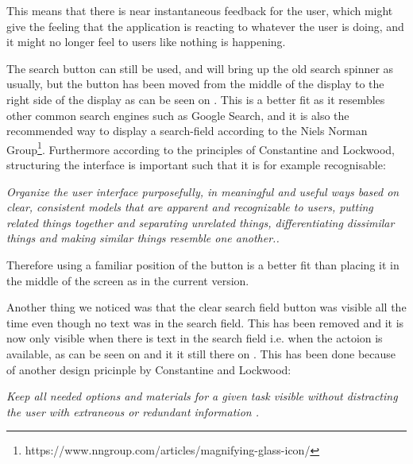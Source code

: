 This means that there is near instantaneous feedback for the user, which might give the feeling that the application is reacting to whatever the user is doing, and it might no longer feel to users like nothing is happening. 

The search button can still be used, and will bring up the old search spinner as usually, but the button has been moved from the middle of the display to the right side of the display as can be seen on . 
This is a better fit as it resembles other common search engines such as Google Search, and it is also the recommended way to display a search-field according to the Niels Norman Group\footnote{https://www.nngroup.com/articles/magnifying-glass-icon/}. 
Furthermore according to the principles of Constantine and Lockwood, structuring the interface is important such that it is for example recognisable: 

\begin{displayquote}
\textit{Organize the user interface purposefully, in meaningful and useful ways based on clear, consistent models that are apparent and recognizable to users, putting related things together and separating unrelated things, differentiating dissimilar things and making similar things resemble one
another.\cite[p.~51]{DESIGNBOOK}.}
\end{displayquote}
\noindent
Therefore using a familiar position of the button is a better fit than placing it in the middle of the screen as in the current version.

Another thing we noticed was that the clear search field button was visible all the time even though no text was in the search field.
This has been removed and it is now only visible when there is text in the search field i.e. when the actoion is available, as can be seen on  and it it still there on .
This has been done because of another design pricinple by Constantine and Lockwood: 

\begin{displayquote}
\textit{Keep all needed options and materials for a given task visible without distracting the user with extraneous or redundant information \cite[p.~55]{DESIGNBOOK}.}
\end{displayquote}

